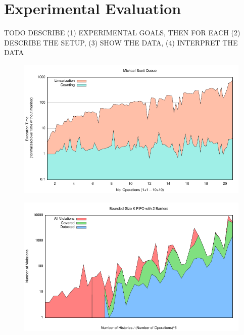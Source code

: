 \section{Experimental Evaluation}
\label{sec:exp}

TODO DESCRIBE (1) EXPERIMENTAL GOALS, THEN FOR EACH (2) DESCRIBE THE SETUP,
(3) SHOW THE DATA, (4) INTERPRET THE DATA

\begin{figure}
  \centering
  \includegraphics[width=\linewidth]{figures/lin-vs-counting-time}
\end{figure}

\begin{figure}
  \centering
  \includegraphics[width=\linewidth]{figures/coverage-bkq-2-barriers}
\end{figure}
